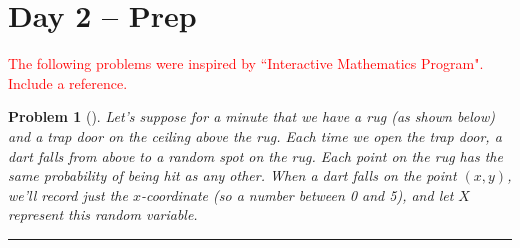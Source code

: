 \documentclass[letterpaper,oneside]{book}%
\theoremstyle{plain}
\theoremstyle{box}
\theoremstyle{problem}
\newtheorem{problemnum}{Problem}[chapter]
\newenvironment{problem}[1][]{\begin{problemnum}[#1]}{\end{problemnum}\nopagebreak\hrule\bigskip}
\begin{document}
\section{Day 2 -- Prep}
\textcolor{red}{The following problems were inspired by ``Interactive Mathematics Program". Include a reference.}
\begin{problem}
 Let's suppose for a minute that we have a rug (as shown below) and a trap door on the ceiling above the rug. 
 Each time we open the trap door, a dart falls from above to a random spot on the rug. 
 Each point on the rug has the same probability of being hit as any other. 
 When a dart falls on the point $(x,y)$,  we'll record just the $x$-coordinate (so a number between 0 and 5), and let $X$ represent this random variable. 
 
 
 \begin{enumerate}


\end{enumerate}
\end{problem}
\end{document}
